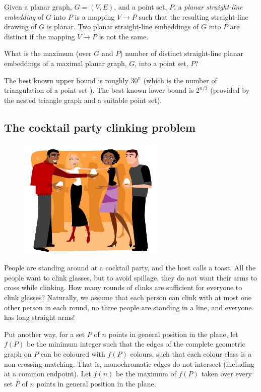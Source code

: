 \documentclass{patmorin}
\newcommand{\poser}[1]{\noindent{\textit{#1}}}
\begin{document}
\poser{Fabrizio Frati}

Given a planar graph, $G=(V,E)$, and a point set, $P$, a \emph{planar
straight-line embedding} of $G$ into $P$ is a mapping $V\to P$ such
that the resulting straight-line drawing of $G$ is planar.  Two planar
straight-line embeddings of $G$ into $P$ are distinct if the mapping
$V\to P$ is not the same.


\begin{op}
  What is the maximum (over $G$ and $P$) number of distinct straight-line
  planar embeddings of a maximal planar graph, $G$, into a point set, $P$?
\end{op}

The best known upper bound is roughly $30^n$ (which is the number of
triangulation of a point set \cite{s12}).  The best known
lower bound is $2^{n/3}$ (provided by the nested triangle graph and a
suitable point set).


\subsection{The cocktail party clinking problem}

\poser{David Wood}

\begin{figure}
\hfill\includegraphics[width=70mm]{party}
\end{figure}
People are standing around at a cocktail party,  and the host calls a
toast. All the people want to clink glasses, but to avoid spillage, they
do not want their arms to cross while clinking. How many rounds of clinks
are sufficient for everyone to clink glasses? Naturally, we assume that
each person can clink with at most one other person in each round, no
three people are standing in a line, and everyone has long straight arms!

Put another way, for a set $P$ of $n$ points in general position in
the plane, let $f(P)$ be the minimum integer such that the edges of the
complete geometric graph on $P$ can be coloured with $f(P)$ colours, such
that each colour class is a non-crossing matching. That is, monochromatic
edges do not intersect (including at a common endpoint). Let $f(n)$ be
the maximum of $f(P)$ taken over every set $P$ of $n$ points in general
position in the plane.
\end{document}

